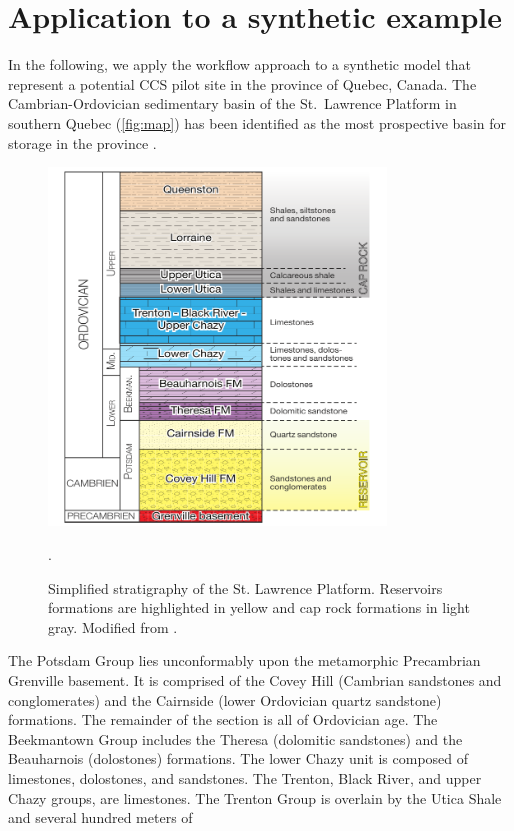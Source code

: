 \section{Application to a synthetic example}
In the following, we apply the workflow approach to a synthetic model that
represent a potential CCS pilot site in the province of Quebec, Canada.
The Cambrian-Ordovician sedimentary basin of the St.\ Lawrence Platform in
southern Quebec (\cref{fig:map}) has been identified as the most prospective
basin for  storage in the province \citep{Malo2012}.
\begin{figure}[!ht]
\centering
\includegraphics[width=0.8\textwidth]{fig/strati.pdf}
\caption{Simplified stratigraphy of the St. Lawrence Platform. Reservoirs
formations are highlighted in yellow and cap rock formations in light gray.
Modified from \citep{Claprood2012}.}
\label{fig:strati2}.
\end{figure}
The Potsdam Group lies unconformably upon the metamorphic Precambrian Grenville
basement. It is comprised of the Covey Hill (Cambrian sandstones and
conglomerates) and the Cairnside (lower Ordovician quartz sandstone) formations.
The remainder of the section is all of Ordovician age. The Beekmantown Group
includes the Theresa (dolomitic sandstones) and the Beau\-har\-nois (dolostones)
formations. The lower Chazy unit is composed of limestones, dolostones, and
sandstones. The Trenton, Black River, and upper Chazy groups, are limestones.
The Trenton Group is overlain by the Utica Shale and several hundred meters of
